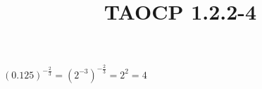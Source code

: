 \documentclass{article}
\title{TAOCP 1.2.2\mbox{-}4}
\begin{document}
\maketitle

\( {(0.125)}^{-\frac{2}{3}} = {(2^{-3})}^{-\frac{2}{3}} = 2^{2} = 4 \)
\end{document}

